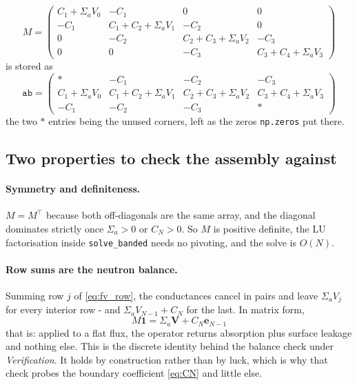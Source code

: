 \documentclass[11pt]{article}
\begin{document}
{\begin{equation}
    M =
    \begin{pmatrix}
        C_1 + \Sigma_a V_0 & -C_1 & 0 & 0 \\
        -C_1 & C_1 + C_2 + \Sigma_a V_1 & -C_2 & 0 \\
        0 & -C_2 & C_2 + C_3 + \Sigma_a V_2 & -C_3 \\
        0 & 0 & -C_3 & C_3 + C_4 + \Sigma_a V_3
    \end{pmatrix}
\end{equation}
is stored as
\begin{equation}
    \texttt{ab} =
    \begin{pmatrix}
        \ast & -C_1 & -C_2 & -C_3 \\
        C_1 + \Sigma_a V_0 & C_1 + C_2 + \Sigma_a V_1 & C_2 + C_3 + \Sigma_a V_2 & C_3 + C_4 + \Sigma_a V_3 \\
        -C_1 & -C_2 & -C_3 & \ast
    \end{pmatrix}
\end{equation}
the two $\ast$ entries being the unused corners, left as the zeros \texttt{np.zeros} put there.

\subsection*{Two properties to check the assembly against}
\label{app:properties}

\paragraph{Symmetry and definiteness.} $M = M^{\!\top}$ because both off-diagonals are the same array, and the diagonal dominates strictly once $\Sigma_a > 0$ or $C_N > 0$. So $M$ is positive definite, the LU factorisation inside \texttt{solve\_banded} needs no pivoting, and the solve is $O(N)$.

\paragraph{Row sums are the neutron balance.} Summing row $j$ of \eqref{eq:fv_row}, the conductances cancel in pairs and leave $\Sigma_a V_j$ for every interior row - and $\Sigma_a V_{N-1} + C_N$ for the last. In matrix form,
\begin{equation}
    M \mathbf{1} = \Sigma_a \mathbf{V} + C_N \mathbf{e}_{N-1}
\end{equation}
that is: applied to a flat flux, the operator returns absorption plus surface leakage and nothing else. This is the discrete identity behind the balance check under \emph{Verification}. It holds by construction rather than by luck, which is why that check probes the boundary coefficient \eqref{eq:CN} and little else.

}
\end{document}
